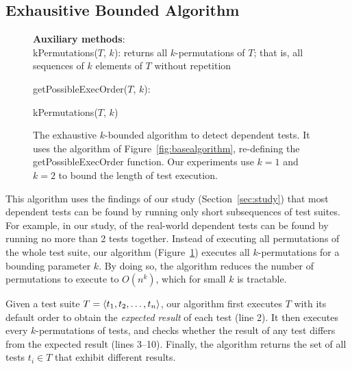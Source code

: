 

\subsection{Exhausitive Bounded Algorithm}
\label{sec:basic}

\begin{figure}[t]
\textbf{Auxiliary methods}:\\
kPermutations($T$, $k$): returns all $k$-permutations of $T$; that is, all
sequences of $k$ elements of $T$ without repetition

\medskip

getPossibleExecOrder($T$, $k$):\\
\vspace{-5mm}
\begin{algorithmic}[1]
\RETURN kPermutations($T$, $k$)
\end{algorithmic}

\vspace{-3mm}
\caption {The exhaustive $k$-bounded algorithm to detect dependent tests.
It uses the algorithm of Figure~\ref{fig:basealgorithm}, re-defining the
getPossibleExecOrder function.
Our experiments use $k=1$ and $k=2$ to bound the length of
test execution. } 
\label{fig:exhaustivealgorithm}
\end{figure}



This algorithm uses the findings of our study
(Section~\ref{sec:study})
that most dependent tests can be found by running only short
subsequences of test suites. For example,
in our study, \pertange of the real-world dependent tests
can be found by running no more than 2 tests together.
Instead of executing all permutations of the
whole test suite, our algorithm (Figure~\ref{fig:exhaustivealgorithm})
executes all $k$-permutations for a bounding
parameter $k$.
By doing so, the algorithm reduces
the number of permutations to execute
to $O(n^k)$, which for small $k$ is tractable. 


Given a test suite $T =  \langle t_1, t_2, \ldots, t_n \rangle $, our algorithm
first executes $T$ with its default order
to obtain the \emph{expected result} of each test (line 2). 
It then executes every $k$-permutations of tests,
and checks whether the result of any test differs
from the expected result (lines 3--10). Finally, the algorithm returns the set
of all tests $t_i \in T$
that exhibit different results.





